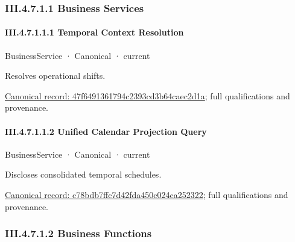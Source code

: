 \subsubsection*{III.4.7.1.1 Business Services}
\label{navigation:III.4.7.1.1}

\paragraph*{III.4.7.1.1.1 Temporal Context Resolution}
\label{navigation:III.4.7.1.1.1}

\label{element:47f6491361794c2393cd3b64caec2d1a}
{\small BusinessService · Canonical · current}\par

Resolves operational shifts.


{\footnotesize \href{../../../../../../../continuum/business/business-service/47f6491361794c2393cd3b64caec2d1a.md}{Canonical record: 47f6491361794c2393cd3b64caec2d1a}; full qualifications and provenance.}\par
\paragraph*{III.4.7.1.1.2 Unified Calendar Projection Query}
\label{navigation:III.4.7.1.1.2}

\label{element:c78bdb7ffc7d42fda450c024ca252322}
{\small BusinessService · Canonical · current}\par

Discloses consolidated temporal schedules.


{\footnotesize \href{../../../../../../../continuum/business/business-service/c78bdb7ffc7d42fda450c024ca252322.md}{Canonical record: c78bdb7ffc7d42fda450c024ca252322}; full qualifications and provenance.}\par
\subsubsection*{III.4.7.1.2 Business Functions}
\label{navigation:III.4.7.1.2}


